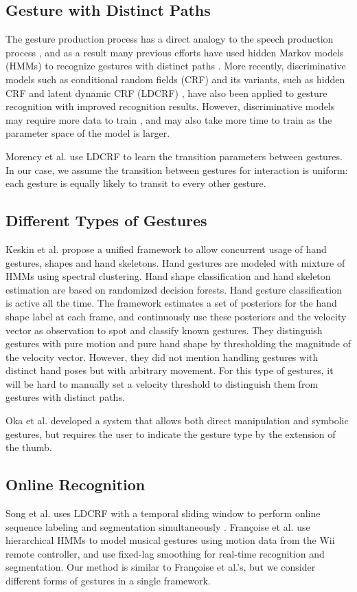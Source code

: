 \subsection{Gesture with Distinct Paths}
The gesture production process has a direct analogy to the
speech production process \cite{Kettebekov01}, and as a result many previous
efforts have used hidden Markov models (HMMs) to recognize gestures
with distinct paths \cite{Starner95, sharma00}. More recently, discriminative models such as
conditional random fields (CRF) and its variants, such as hidden CRF
\cite{wang06} and latent dynamic CRF (LDCRF) \cite{morency07}, have also been
applied to gesture recognition with improved recognition results.
However, discriminative models may require more data to train \cite{ng02},
and may also take more time to train as the parameter space of the model is
larger.

Morency et al. \cite{morency07} use LDCRF to learn the transition parameters
between gestures. In our case, we assume the transition between gestures for
interaction is uniform: each gesture is equally likely to transit to every
other gesture.

\subsection{Different Types of Gestures}
Keskin et al. \cite{keskin12} propose a unified framework to allow concurrent
usage of hand gestures, shapes and hand skeletons. Hand gestures are modeled
with mixture of HMMs using spectral clustering. Hand shape classification and
hand skeleton estimation are based on randomized decision forests. Hand
gesture classification is active all the time. The framework estimates a set of
posteriors for the hand shape label at each frame, and continuously use these
posteriors and the velocity vector as observation to spot and classify known
gestures. They distinguish gestures with pure motion and pure hand shape by
thresholding the magnitude of the velocity vector. However, they did not mention
handling gestures with distinct hand poses but with arbitrary movement. For this
type of gestures, it will be hard to manually set a velocity threshold to
distinguish them from gestures with distinct paths.

Oka et al. \cite{Oka02} developed a system that
allows both direct manipulation and symbolic gestures, but requires the user to
indicate the gesture type by the extension of the thumb.

\subsection{Online Recognition}
Song et al. uses LDCRF with a temporal sliding window to perform
online sequence labeling and segmentation simultaneously \cite{song12}. 
Fran{\c{c}}oise et al. \cite{francoise11} use hierarchical HMMs to model musical
gestures using motion data from the Wii remote controller, and use fixed-lag
smoothing for real-time recognition and segmentation.
Our method is similar to Fran{\c{c}}oise et al.'s, but we consider different
forms of gestures in a single framework.

